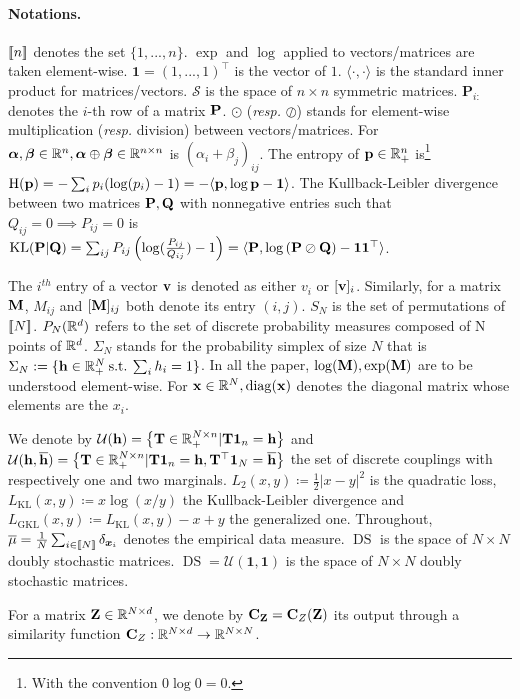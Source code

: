 \paragraph{Notations.} ${[\![n]\!]}$ denotes the set $\{1,...,n\}$. $\exp$ and $\log$ applied to vectors/matrices are taken element-wise. $\bm{1}
= (1,...,1)^\top$ is the vector of $1$. $\langle \cdot, \cdot \rangle$ is the standard inner product for matrices/vectors. $\mathcal{S}$ is the space of $n \times n$ symmetric matrices. $\mathbf{P}_{i:}$ denotes the $i$-th row of a matrix $\mathbf{P}$. $\odot$ (\textit{resp.} $\oslash$) stands for element-wise multiplication (\textit{resp.} division) between vectors/matrices. For $\bm{\alpha}, \bm{\beta} \in \mathbb{R}^n, \bm{\alpha} \oplus \bm{\beta} \in \mathbb{R}^{n \times n}$ is $(\alpha_i + \beta_j)_{ij}$. The entropy of $\mathbf{p} \in \mathbb{R}^{n}_+$ is\footnote{With the convention $0 \log 0 = 0$.} $\operatorname{H}(\mathbf{p}) = -\sum_{i} p_i(\log(p_i)-1) = -\langle \mathbf{p}, \log \mathbf{p} - \bm{1} \rangle$. The Kullback-Leibler divergence between two matrices $\mathbf{P}, \mathbf{Q}$ with nonnegative entries such that $Q_{ij} = 0 \implies P_{ij}=0$ is $\operatorname{KL}(\mathbf{P} | \mathbf{Q}) = \sum_{ij} P_{ij}\left(\log(\frac{P_{ij}}{Q_{ij}})-1\right) = \langle \mathbf{P}, \log \left(\mathbf{P} \oslash \mathbf{Q} \right) - \bm{1}\bm{1}^\top \rangle$.


The $i^{th}$ entry of a vector ${\mathbf{v}}$ is denoted as either $v_i$ or $[{\mathbf{v}}]_i$.
Similarly, for a matrix ${\mathbf{M}}$, $M_{ij}$ and $[{\mathbf{M}}]_{ij}$ both denote its entry $(i,j)$. $S_N$ is the set of permutations of ${[\![N]\!]}$.
$P_N(\mathbb{R}^d)$ refers to the set of discrete probability measures composed of N points of $\mathbb{R}^d$.
$\Sigma_N$ stands for the probability simplex of size $N$ that is $\Sigma_N := \{{\mathbf{h}} \in \mathbb{R}^N_+ \: \text{s.t.} \: \sum_i h_i = 1 \}$. In all the paper, $\log({\mathbf{M}}), \exp({\mathbf{M}})$ are to be understood element-wise. For ${\mathbf{x}} \in \mathbb{R}^{N}, \operatorname{diag}({\mathbf{x}})$ denotes the diagonal matrix whose elements are the $x_i$.


We denote by ${\mathcal{U}}({\mathbf{h}}) = \left\{ {\mathbf{T}} \in \mathbb{R}_+^{N \times n} | {\mathbf{T}} \bm{1}_n = {\mathbf{h}} \right\}$ and ${\mathcal{U}}({\mathbf{h}}, \overline{{\mathbf{h}}}) = \left\{ {\mathbf{T}} \in \mathbb{R}_+^{N \times n} | {\mathbf{T}} \bm{1}_n = {\mathbf{h}}, {\mathbf{T}}^\top \bm{1}_N = \overline{{\mathbf{h}}} \right\}$ the set of discrete couplings with respectively one and two marginals.
 $L_2(x,y) \coloneqq \frac{1}{2} |x - y|^2$ is the quadratic loss,  $L_{\mathrm{KL}}(x,y) \coloneqq x \log (x/y)$ the Kullback-Leibler divergence and $L_{\mathrm{GKL}}(x,y) \coloneqq L_{\mathrm{KL}}(x,y) - x + y $ the generalized one.
Throughout, $\overline{\mu} = \frac{1}{N} \sum_{i \in {[\![N]\!]}} \delta_{\bm{x}_i}$ denotes the empirical data measure. 
$\operatorname{DS}$ is the space of $N \times N$ doubly stochastic matrices.
$\operatorname{DS} = \mathcal{U}(\bm{1}, \bm{1})$ is the space of $N \times N$ doubly stochastic matrices.

For a matrix ${\mathbf{Z}} \in \mathbb{R}^{N \times d}$, we denote by ${\mathbf{C}}_{{\mathbf{Z}}} =  {\mathbf{C}}_{Z}({\mathbf{Z}})$ its output through a similarity function ${\mathbf{C}}_{Z}: \mathbb{R}^{N \times d} \to \mathbb{R}^{N \times N}$.